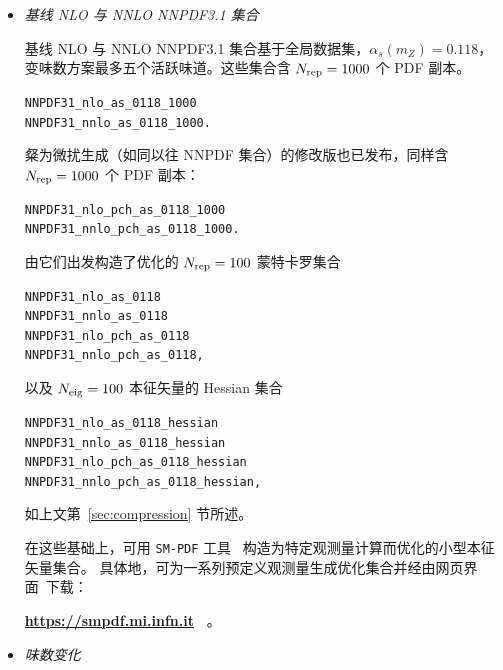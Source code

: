 \begin{itemize}

\item {\it 基线 NLO 与 NNLO NNPDF3.1 集合}

基线 NLO 与 NNLO NNPDF3.1 集合基于全局数据集，$\alpha_s(m_Z)=0.118$，
变味数方案最多五个活跃味道。这些集合含 $N_{\rm rep}=1000$ 个 PDF 副本。
\begin{flushleft}
\tt NNPDF31\_nlo\_as\_0118\_1000 \\
\tt NNPDF31\_nnlo\_as\_0118\_1000.\\
\end{flushleft}
粲为微扰生成（如同以往 NNPDF 集合）的修改版也已发布，同样含 $N_{\rm rep}=1000$ 个 PDF 副本：
\begin{flushleft}
\tt NNPDF31\_nlo\_pch\_as\_0118\_1000 \\
\tt NNPDF31\_nnlo\_pch\_as\_0118\_1000.\\
\end{flushleft}
由它们出发构造了优化的 $N_{\rm rep}=100$ 蒙特卡罗集合
\begin{flushleft}
\tt NNPDF31\_nlo\_as\_0118 \\
\tt NNPDF31\_nnlo\_as\_0118 \\
\tt NNPDF31\_nlo\_pch\_as\_0118 \\
\tt NNPDF31\_nnlo\_pch\_as\_0118,
\end{flushleft}
以及 $N_{\rm eig}=100$ 本征矢量的 Hessian 集合
\begin{flushleft}
\tt NNPDF31\_nlo\_as\_0118\_hessian \\
\tt NNPDF31\_nnlo\_as\_0118\_hessian \\
\tt NNPDF31\_nlo\_pch\_as\_0118\_hessian \\
\tt NNPDF31\_nnlo\_pch\_as\_0118\_hessian,
\end{flushleft}
如上文第~\ref{sec:compression} 节所述。

在这些基础上，可用 {\tt SM-PDF} 工具~\cite{Carrazza:2016htc}
构造为特定观测量计算而优化的小型本征矢量集合。
具体地，可为一系列预定义观测量生成优化集合并经由网页界面~\cite{Carrazza:2016wte}下载：
\begin{center}
{\bf \url{https://smpdf.mi.infn.it}~} 。
\end{center}





\item {\it 味数变化}


\end{itemize}
